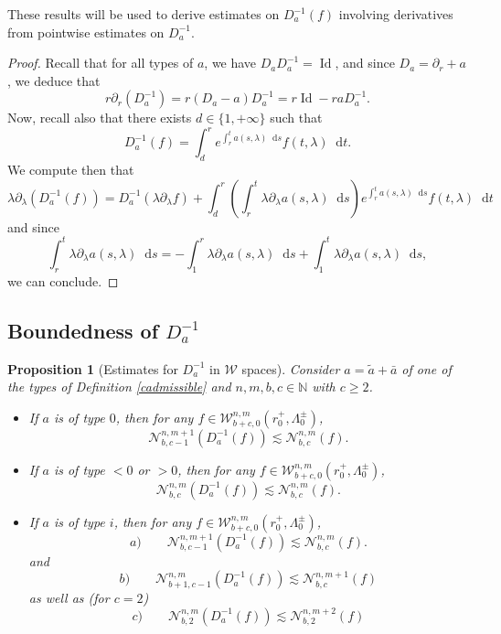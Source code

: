 \documentclass[11 pt]{amsart}
\newcommand{\tmop}[1]{\ensuremath{\operatorname{#1}}}
\newtheorem{prop}{Proposition}[section]
\theoremstyle{definition}
\theoremstyle{remark}
\numberwithin{equation}{section}
\newcommand{\dd}{\mathop{}\!\mathrm{d}}
\begin{document}
These results will be used to derive estimates on $D_a^{- 1} (f)$ involving derivatives from pointwise estimates on $D_a^{-1}$.

\begin{proof}
  Recall that for all types of $a$, we have $D_a D_a^{- 1} = \tmop{Id}$, and
  since $D_a = \partial_r + a$, we deduce that
  \[ r \partial_r (D_a^{- 1}) = r (D_a - a) D_a^{- 1} = r \tmop{Id} - r a
     D_a^{- 1} . \]
  Now, recall also that there exists $d \in \{ 1, + \infty \}$ such that
  \[ D_a^{- 1} (f) = \int_d^r e^{\int_r^t a (s, \lambda)\dd s} f (t,
     \lambda)\dd t. \]
  We compute then that
  \[ \lambda \partial_{\lambda} (D_a^{- 1} (f)) = D_a^{- 1} (\lambda
     \partial_{\lambda} f) + \int_d^r \left( \int_r^t \lambda
     \partial_{\lambda} a (s, \lambda) \dd s\right) e^{\int_r^t a (s, \lambda)
    \dd s} f (t, \lambda)\dd t \]
  and since
  \[ \int_r^t \lambda \partial_{\lambda} a (s, \lambda)\dd s = - \int_1^r
     \lambda \partial_{\lambda} a (s, \lambda)\dd s + \int_1^t \lambda
     \partial_{\lambda} a (s, \lambda)\dd s, \]
  we can conclude.
\end{proof}

\subsection{Boundedness of $D_a^{- 1}$}

\begin{prop}[Estimates for $D_a^{- 1}$ in $\mathcal{W}$ spaces]
  \label{grooving}Consider $a = \widetilde{a} + \bar{a}$ of one of the types of
  Definition \ref{cadmissible} and $n, m, b, c \in \mathbb{N}$ with $c
  \geqslant 2$.
\begin{itemize}
\item[1)] If $a$ is of type $0$, then for any $f \in \mathcal{W}_{b + c, 0}^{n, m}
  (r_0^+, \Lambda_0^{\pm})$,
  \[ \mathcal{N}_{b, c - 1}^{n, m + 1} (D_a^{- 1} (f)) \lesssim
     \mathcal{N}_{b, c}^{n, m} (f) . \]
  
  
\item[2)] If $a$ is of type $< 0$ or $>0$, then for any $f \in \mathcal{W}_{b + c,
  0}^{n, m} (r_0^+, \Lambda_0^{\pm})$,
  \[ \mathcal{N}_{b, c}^{n, m} (D_a^{- 1} (f)) \lesssim \mathcal{N}_{b, c}^{n,
     m} (f) . \]
  
  
\item[3)] If $a$ is of type $i$, then for any $f \in \mathcal{W}_{b + c, 0}^{n, m}
  (r_0^+, \Lambda_0^{\pm})$,
  \[ a) \qquad \mathcal{N}_{b, c - 1}^{n, m + 1} (D_a^{- 1} (f)) \lesssim
     \mathcal{N}_{b, c}^{n, m} (f) . \]
  and
  \[ b) \qquad \mathcal{N}_{b + 1, c - 1}^{n, m} (D_a^{- 1} (f)) \lesssim
     \mathcal{N}_{b, c}^{n, m + 1} (f) \]
as well as (for $c=2$)
\[ c) \qquad \mathcal{N}_{b, 2 }^{n, m} (D_a^{- 1} (f)) \lesssim
     \mathcal{N}_{b, 2}^{n, m + 2} (f)   \]
\end{itemize}
\end{prop}
\end{document}
